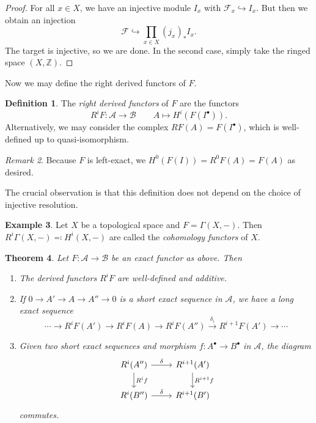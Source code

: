 \documentclass[leqno, openany]{memoir}
\newtheorem{thm}{Theorem}[section]
\theoremstyle{definition}
\newtheorem{defn}[thm]{Definition}
\newtheorem{exm}[thm]{Example}
\theoremstyle{remark}
\newtheorem{rmk}[thm]{Remark}
\theoremstyle{plain}
\theoremstyle{definition}
\theoremstyle{remark}
\newcommand{\Z}{\mathbb{Z}}
\newcommand{\mc}[1]{\mathcal{#1}}
\begin{document}
\begin{proof}
    For all $x \in X$, we have an injective module $I_x$ with $\mc{F}_x \hookrightarrow I_x$. But then we obtain an injection
    \[ \mc{F} \hookrightarrow \prod_{x \in X} {(j_x)}_* I_x. \]
    The target is injective, so we are done. In the second case, simply take the ringed space $(X, \Z)$.
\end{proof}

Now we may define the right derived functors of $F$.
\begin{defn}
    The \textit{right derived functors} of $F$ are the functors
    \[ R^i F \colon \mc{A} \to \mc{B} \qquad A \mapsto H^i(F(I^{\bullet})). \]
    Alternatively, we may consider the complex $RF(A) = F(I^{\bullet})$, which is well-defined up to quasi-isomorphism.
\end{defn}

\begin{rmk}
    Because $F$ is left-exact, we $H^0(F(I)) = R^0 F(A) = F(A)$ as desired.
\end{rmk}

The crucial observation is that this definition does not depend on the choice of injective resolution.

\begin{exm}
    Let $X$ be a topological space and $F = \Gamma(X,-)$. Then $R^i \Gamma(X,-) \eqqcolon H^i(X,-)$ are called the \textit{cohomology functors} of $X$.
\end{exm}

\begin{thm}
    Let $F \colon \mc{A} \to \mc{B}$ be an exact functor as above. Then
    \begin{enumerate}
        \setcounter{enumi}{0}
        \item The derived functors $R^i F$ are well-defined and additive.
        \item If $0 \to A' \to A \to A'' \to 0$ is a short exact sequence in $\mc{A}$, we have a long exact sequence
            \[ \cdots \to R^i F(A') \to R^i F(A) \to R^i F(A'') \xrightarrow{\delta_i} R^{i+1}F(A') \to \cdots \]
        \item Given two short exact sequences and morphism $f \colon A^{\bullet} \to B^{\bullet}$ in $\mc{A}$, the diagram
            \begin{equation*}
            \begin{tikzcd}
                R^i (A'') \ar{r}{\delta} \ar{d}{R^i f} & R^{i+1}(A') \ar{d}{R^{i+1}f} \\
                R^i(B'') \ar{r}{\delta} & R^{i+1}(B')
            \end{tikzcd}
            \end{equation*}
            commutes.
    \end{enumerate}
\end{thm}
\end{document}
